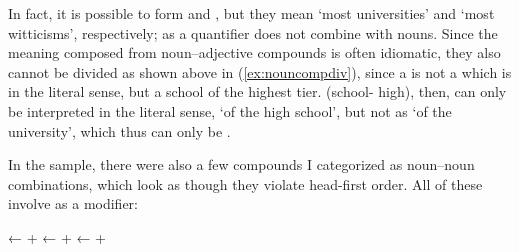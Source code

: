 In fact, it is possible to form  and 
, but they mean `most universities' and `most 
witticisms', respectively;  as a quantifier does not 
combine with nouns. Since the meaning composed from noun--adjective compounds is 
often idiomatic, they also cannot be divided as shown above in 
(\ref{ex:nouncompdiv}), since a  is not 
a  which is  in the literal 
sense, but a school of the highest tier.  
(school-\Gen{} high), then, can only be interpreted in the literal sense, `of 
the high school', but not as `of the university', which thus can only be 
.

In the sample, there were also a few compounds I categorized as noun--noun 
combinations, which look as though they violate head-first order. All of these 
involve  as a modifier:

\pex\label{ex:compsitang}
	\a {}
		← 
		+ 
	\a {}
		← 
		+ 
	\a {}
		← 
		+ 
\xe

